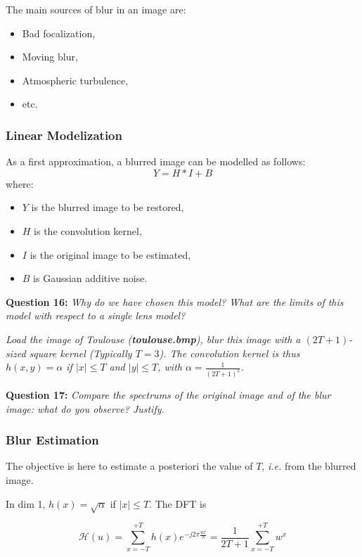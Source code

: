 The main sources of blur in an image are:
\begin{itemize}
    \item Bad focalization,
    \item Moving blur,
    \item Atmospheric turbulence,
    \item etc.
\end{itemize}

\subsubsection{Linear Modelization}

As a first approximation, a blurred image can be modelled as follows:
\begin{equation}
    Y = H * I + B
\end{equation}
where:
\begin{itemize}
    \item $Y$ is the blurred image to be restored,
    \item $H$ is the convolution kernel,
    \item $I$ is the original image to be estimated,
    \item $B$ is Gaussian additive noise.
\end{itemize}

\textbf{Question 16:}
\textit{Why do we have chosen this model? What are the limits of this model with respect to a single lens model?}

\textit{Load the image of Toulouse (\textbf{toulouse.bmp}), blur this image with a $(2T+1)$-sized square kernel (Typically $T = 3$). The convolution kernel is thus $h(x,y) = \alpha$ if $|x| \leq T$ and $|y| \leq T$, with $\alpha = \frac{1}{(2T+1)^2}$.
}

\TODO{}

\textbf{Question 17:}
\textit{Compare the spectrums of the original image and of the blur image: what do you observe? Justify.}

\TODO{}

\subsubsection{Blur Estimation}
The objective is here to estimate a posteriori the value of $T$, \textit{i.e.} from the blurred image.

\noindent In dim 1, $h(x) = \sqrt{\alpha}$ if $|x| \leq T$. The DFT is

\[
\mathcal{H}(u) = \sum_{x=-T}^{+T} h(x)e^{-j 2\pi \frac{ux}{N}} = \frac{1}{2T+1} \sum_{x=-T}^{+T} w^x
\]

